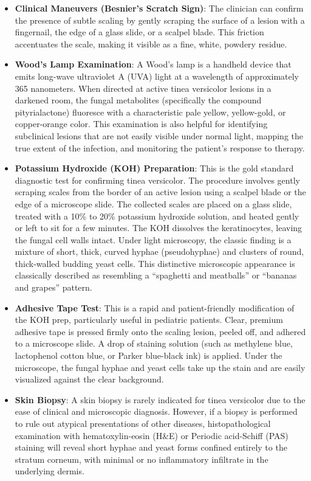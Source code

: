 \begin{itemize}
    \item \textbf{Clinical Maneuvers (Besnier's Scratch Sign)}: The clinician can confirm the presence of subtle scaling by gently scraping the surface of a lesion with a fingernail, the edge of a glass slide, or a scalpel blade. This friction accentuates the scale, making it visible as a fine, white, powdery residue.
    \item \textbf{Wood's Lamp Examination}: A Wood's lamp is a handheld device that emits long-wave ultraviolet A (UVA) light at a wavelength of approximately 365 nanometers. When directed at active tinea versicolor lesions in a darkened room, the fungal metabolites (specifically the compound pityrialactone) fluoresce with a characteristic pale yellow, yellow-gold, or copper-orange color. This examination is also helpful for identifying subclinical lesions that are not easily visible under normal light, mapping the true extent of the infection, and monitoring the patient's response to therapy.
    \item \textbf{Potassium Hydroxide (KOH) Preparation}: This is the gold standard diagnostic test for confirming tinea versicolor. The procedure involves gently scraping scales from the border of an active lesion using a scalpel blade or the edge of a microscope slide. The collected scales are placed on a glass slide, treated with a 10\% to 20\% potassium hydroxide solution, and heated gently or left to sit for a few minutes. The KOH dissolves the keratinocytes, leaving the fungal cell walls intact. Under light microscopy, the classic finding is a mixture of short, thick, curved hyphae (pseudohyphae) and clusters of round, thick-walled budding yeast cells. This distinctive microscopic appearance is classically described as resembling a ``spaghetti and meatballs'' or ``bananas and grapes'' pattern.
    \item \textbf{Adhesive Tape Test}: This is a rapid and patient-friendly modification of the KOH prep, particularly useful in pediatric patients. Clear, premium adhesive tape is pressed firmly onto the scaling lesion, peeled off, and adhered to a microscope slide. A drop of staining solution (such as methylene blue, lactophenol cotton blue, or Parker blue-black ink) is applied. Under the microscope, the fungal hyphae and yeast cells take up the stain and are easily visualized against the clear background.
    \item \textbf{Skin Biopsy}: A skin biopsy is rarely indicated for tinea versicolor due to the ease of clinical and microscopic diagnosis. However, if a biopsy is performed to rule out atypical presentations of other diseases, histopathological examination with hematoxylin-eosin (H\&E) or Periodic acid-Schiff (PAS) staining will reveal short hyphae and yeast forms confined entirely to the stratum corneum, with minimal or no inflammatory infiltrate in the underlying dermis.

\end{itemize}
